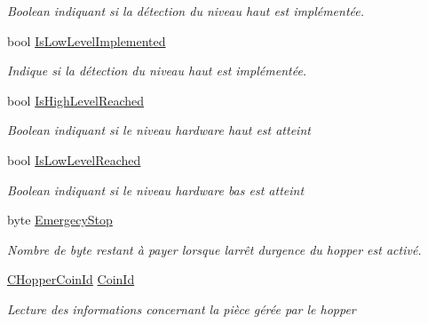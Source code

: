 \begin{DoxyCompactItemize}
\begin{DoxyCompactList}\small\item\em Boolean indiquant si la détection du niveau haut est implémentée. \end{DoxyCompactList}\item 
bool \mbox{\hyperlink{class_device_library_1_1_c_hopper_a15324622637cfb57c9a24f321d55a496}{Is\+Low\+Level\+Implemented}}
\begin{DoxyCompactList}\small\item\em Indique si la détection du niveau haut est implémentée. \end{DoxyCompactList}\item 
bool \mbox{\hyperlink{class_device_library_1_1_c_hopper_a4f4d3bcff66d7377ab203313ab1778f8}{Is\+High\+Level\+Reached}}
\begin{DoxyCompactList}\small\item\em Boolean indiquant si le niveau hardware haut est atteint \end{DoxyCompactList}\item 
bool \mbox{\hyperlink{class_device_library_1_1_c_hopper_a04e41e117c79e3ac0c3cd3dc38d3931e}{Is\+Low\+Level\+Reached}}
\begin{DoxyCompactList}\small\item\em Boolean indiquant si le niveau hardware bas est atteint \end{DoxyCompactList}\item 
byte \mbox{\hyperlink{class_device_library_1_1_c_hopper_a1a49cc5d1094fa17df2b465c2c53f658}{Emergecy\+Stop}}
\begin{DoxyCompactList}\small\item\em Nombre de byte restant à payer lorsque l\textquotesingle{}arrêt d\textquotesingle{}urgence du hopper est activé. \end{DoxyCompactList}\item 
\mbox{\hyperlink{class_device_library_1_1_c_hopper_1_1_c_hopper_coin_id}{C\+Hopper\+Coin\+Id}} \mbox{\hyperlink{class_device_library_1_1_c_hopper_ac3540ffaafc86345d05281840157f5ad}{Coin\+Id}}
\begin{DoxyCompactList}\small\item\em Lecture des informations concernant la pièce gérée par le hopper \end{DoxyCompactList}\end{DoxyCompactItemize}
